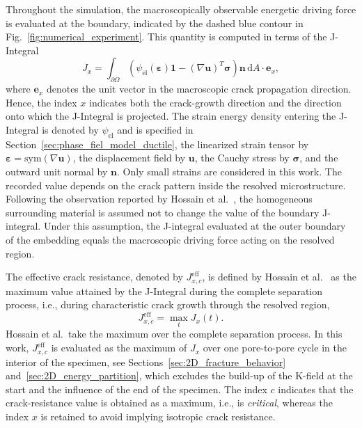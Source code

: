 \documentclass[pdflatex,sn-mathphys-num]{sn-jnl}%
\theoremstyle{thmstyleone}%
\theoremstyle{thmstyletwo}%
\theoremstyle{thmstylethree}%
\begin{document}
Throughout the simulation, the macroscopically observable energetic driving force is evaluated at the boundary, indicated by the dashed blue contour in Fig.~\ref{fig:numerical_experiment}.
This quantity is computed in terms of the J-Integral
\begin{equation}
    J_x = \int_{\partial\Omega}\left(\psi_{\text{el}}(\boldsymbol{\varepsilon})\boldsymbol{1} - \left(\nabla\boldsymbol{u}\right)^T\boldsymbol{\sigma}\right)\boldsymbol{n} \, \mathrm{d}A \cdot \boldsymbol{e}_x,
    \label{eq:J-integral}
\end{equation}
where $\boldsymbol{e}_x$ denotes the unit vector in the macroscopic crack propagation direction. Hence, the index $x$ indicates both the crack-growth direction and the direction onto which the J-Integral is projected.
The strain energy density entering the J-Integral is denoted by $\psi_{\text{el}}$ and is specified in Section~\ref{sec:phase_fiel_model_ductile}, the linearized strain tensor by $\boldsymbol{\varepsilon} = \text{sym}(\nabla{\boldsymbol{u}})$, the displacement field by $\boldsymbol{u}$, the Cauchy stress by $\boldsymbol{\sigma}$, and the outward unit normal by $\boldsymbol{n}$.
Only small strains are considered in this work.
The recorded value depends on the crack pattern inside the resolved microstructure. Following the observation reported by Hossain et al.~\cite{hossain_effective_2014}, the homogeneous surrounding material is assumed not to change the value of the boundary J-integral. Under this assumption, the J-integral evaluated at the outer boundary of the embedding equals the macroscopic driving force acting on the resolved region.

The effective crack resistance, denoted by $J_{x,c}^{\text{eff}}$, is defined by Hossain et al.~\cite{hossain_effective_2014} as the maximum value attained by the J-Integral during the complete separation process, i.e., during characteristic crack growth through the resolved region,
\begin{equation}
    J_{x,c}^{\text{eff}} = \max_t J_x(t).
\end{equation}
Hossain et al.\ take the maximum over the complete separation process. In this work, $J_{x,c}^{\text{eff}}$ is evaluated as the maximum of $J_x$ over one pore-to-pore cycle in the interior of the specimen, see Sections~\ref{sec:2D_fracture_behavior} and~\ref{sec:2D_energy_partition}, which excludes the build-up of the K-field at the start and the influence of the end of the specimen.
The index $c$ indicates that the crack-resistance value is obtained as a maximum, i.e., is \textsl{critical}, whereas the index $x$ is retained to avoid implying isotropic crack resistance.
\end{document}
